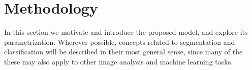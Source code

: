 \chapter{Methodology}
In this section we motivate and introduce the proposed model, and explore its parametrization.
Wherever possible, concepts related to segmentation and classification will be described in their most general sense, since many of the these may also apply to other image analysis and machine learning tasks.
